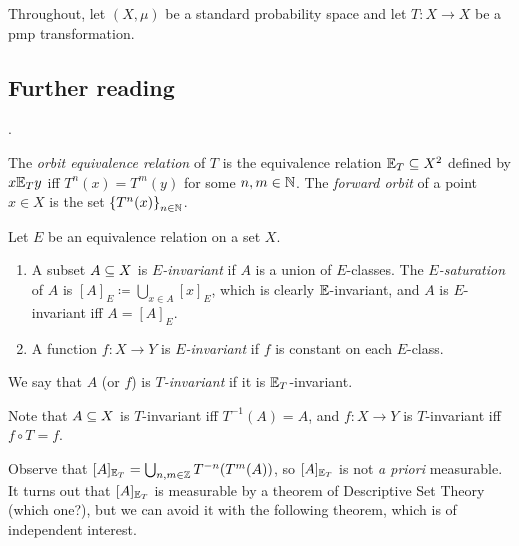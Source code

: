 \documentclass[reqno, twoside]{article}
\begin{document}
    Throughout, let $(X,\mu)$ be a standard probability space and let $T:X\to X$ be a pmp transformation.

    {\vspace{-0.1in}\small\subsection*{Further reading}\cite[Lectures 1 to 4]{Tse22}.}

    \begin{definition}
        The \textit{orbit equivalence relation} of $T$ is the equivalence relation $\mathbb{E}_T\subseteq X^2$ defined by $x\mathbb{E}_Ty$ iff $T^n(x)=T^m(y)$ for some $n,m\in\mathbb{N}$. The \textit{forward orbit} of a point $x\in X$ is the set $\left\{T^n(x)\right\}_{n\in\mathbb{N}}$.
    \end{definition}

    \begin{definition}
        Let $E$ be an equivalence relation on a set $X$.
        \begin{enumerate}
            \item A subset $A\subseteq X$ is \textit{$E$-invariant} if $A$ is a union of $E$-classes. The \textit{$E$-saturation} of $A$ is $[A]_E\coloneqq\bigcup_{x\in A}[x]_E$, which is clearly $\mathbb{E}$-invariant, and $A$ is $E$-invariant iff $A=[A]_E$.
                \vspace{-0.05in}
            \item A function $f:X\to Y$ is \textit{$E$-invariant} if $f$ is constant on each $E$-class.
        \end{enumerate}
        We say that $A$ (or $f$) is \textit{$T$-invariant} if it is $\mathbb{E}_T$-invariant.
    \end{definition}

    \begin{remark}
        Note that $A\subseteq X$ is $T$-invariant iff $T^{-1}(A)=A$, and $f:X\to Y$ is $T$-invariant iff $f\circ T=f$.
    \end{remark}

    Observe that $[A]_{\mathbb{E}_T}=\bigcup_{n,m\in\mathbb{Z}}T^{-n}(T^m(A))$, so $[A]_{\mathbb{E}_T}$ is not \textit{a priori} measurable. It turns out that $[A]_{\mathbb{E}_T}$ is measurable by a theorem of Descriptive Set Theory (which one?), but we can avoid it with the following theorem, which is of independent interest.
\end{document}
